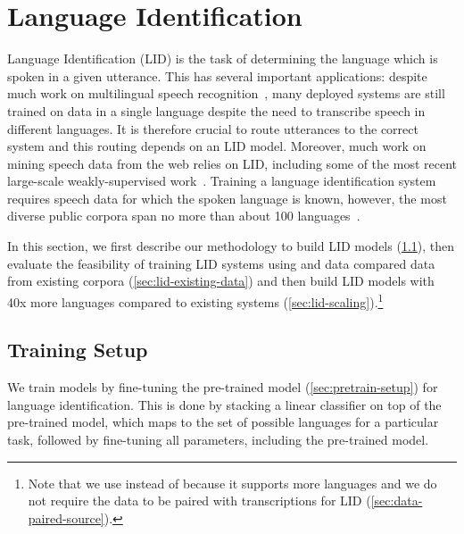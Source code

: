\section{Language Identification}
\label{sec:lid}

Language Identification (LID) is the task of determining the language which is spoken in a given utterance. 
This has several important applications: 
despite much work on multilingual speech recognition~\citep{burget2010multilingual, lin2009study,heigold2013multilingual,bourlard2011current,cho2018multilingual,toshniwal2018multilingual,kannan2019mult,li2019bytes,pratap2020massively}, many deployed systems are still trained on data in a single language despite the need to  transcribe speech in different languages. 
It is therefore crucial to route utterances to the correct system and this routing depends on an LID model.
Moreover, much work on mining speech data from the web relies on LID, including some of the most recent large-scale weakly-supervised work~\citep{radford2022whisper}.
Training a language identification system requires speech data for which the spoken language is known, however, the most diverse public corpora span no more than about 100 languages~\citep{valk2020voxlingua,conneau2022fleurs}.

In this section, we first describe our methodology to build LID models (\textsection\ref{sec:lid-setup}), then evaluate the feasibility of training LID systems using \MMSU{} and \GRN{} data compared data from existing corpora (\textsection\ref{sec:lid-existing-data}) and then build LID models with 40x more languages compared to existing systems (\textsection\ref{sec:lid-scaling}).\footnote{Note that we use \MMSU{} instead of \MMS{} because it supports more languages and we do not require the data to be paired with transcriptions for LID (\textsection\ref{sec:data-paired-source}).}



\subsection{Training Setup}
\label{sec:lid-setup}

We train models by fine-tuning the  pre-trained model (\textsection\ref{sec:pretrain-setup}) for language identification.
This is done by stacking a linear classifier on top of the pre-trained model, which maps to the set of possible languages for a particular task, followed by fine-tuning all parameters, including the pre-trained model.

